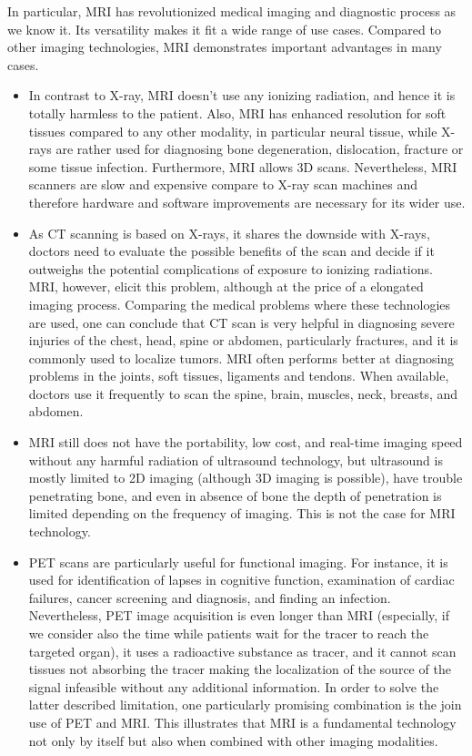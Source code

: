 In particular, MRI has revolutionized medical imaging and diagnostic process as we know it. Its versatility makes it fit a wide range of use cases. Compared to other imaging technologies, MRI demonstrates important advantages in many cases.
\begin{itemize}
    \item In contrast to X-ray, MRI doesn't use any ionizing radiation, and hence it is totally harmless to the patient. Also, MRI has enhanced resolution for soft tissues compared to any other modality, in particular neural tissue,  while X-rays are rather used for diagnosing bone degeneration, dislocation, fracture or some tissue infection. Furthermore, MRI allows 3D scans. Nevertheless, MRI scanners are slow and expensive compare to X-ray scan machines and therefore hardware and software improvements are necessary for its wider use.
    \item As CT scanning is based on X-rays, it shares the downside with X-rays, doctors need to evaluate the possible benefits of the scan and decide if it outweighs the potential complications of exposure to ionizing radiations. MRI, however, elicit this problem, although at the price of a elongated imaging process. Comparing the medical problems where these technologies are used, one can conclude that CT scan is very helpful in diagnosing severe injuries of the chest, head, spine or abdomen, particularly fractures, and it is commonly used to localize tumors. MRI often performs better at diagnosing problems in the joints, soft tissues, ligaments and tendons. When available, doctors use it frequently to scan the spine, brain, muscles, neck, breasts, and abdomen.
    \item MRI still does not have the portability, low cost, and real-time imaging speed without any harmful radiation of ultrasound technology, but ultrasound is mostly limited to 2D imaging (although 3D imaging is possible), have trouble penetrating bone, and even in absence of bone the depth of penetration is limited depending on the frequency of imaging. This is not the case for MRI technology.
    \item PET scans are particularly useful for functional imaging. For instance, it is used for identification of lapses in cognitive function, examination of cardiac failures, cancer screening and diagnosis, and finding an infection.  Nevertheless, PET image acquisition is even longer than MRI (especially, if we consider also the time while patients wait for the tracer to reach the targeted organ), it uses a radioactive substance as tracer, and it cannot scan tissues not absorbing the tracer making the localization of the source of the signal infeasible without any additional information. In order to solve the latter described limitation, one particularly promising combination is the join use of PET and MRI. This illustrates that MRI is a fundamental technology not only by itself but also when combined with other imaging modalities.
\end{itemize}
